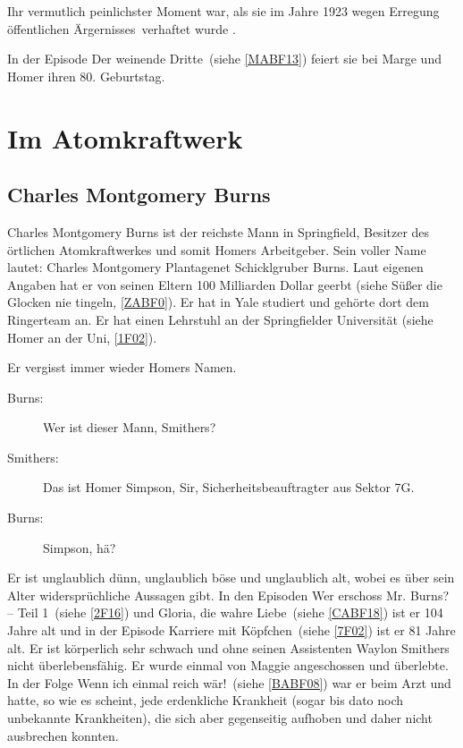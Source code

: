Ihr vermutlich peinlichster Moment war, als sie im Jahre 1923 wegen \glqq Erregung öffentlichen Ärgernisses\grqq\ verhaftet wurde \cite{SpringfieldAt}.

In der Episode \glqq Der weinende Dritte\grqq\ (siehe \ref{MABF13}) feiert sie bei Marge und Homer ihren 80. Geburtstag.

\section{Im Atomkraftwerk}

\subsection{Charles Montgomery Burns}\label{CMBurns}
Charles Montgomery Burns ist der reichste Mann in Springfield, Besitzer des örtlichen Atomkraftwerkes und somit Homers Arbeitgeber. Sein voller Name lautet: Charles Montgomery Plantagenet Schicklgruber Burns. Laut eigenen Angaben hat er von seinen Eltern 100 Milliarden Dollar geerbt (siehe \glqq Süßer die Glocken nie tingeln\grqq, \ref{ZABF0}). Er hat in Yale studiert und gehörte dort dem Ringerteam an. Er hat einen Lehrstuhl an der Springfielder Universität (siehe \glqq Homer an der Uni\grqq, \ref{1F02}). 

Er vergisst immer wieder Homers Namen.
\begin{description}
	\item[Burns:] \glqq Wer ist dieser Mann, Smithers?\grqq
	\item[Smithers:] \glqq Das ist Homer Simpson, Sir, Sicherheitsbeauftragter aus Sektor 7G.\grqq
	\item[Burns:] \glqq Simpson, hä?\grqq
\end{description}
Er ist unglaublich dünn, unglaublich böse und unglaublich alt, wobei es über sein Alter widersprüchliche Aussagen gibt. In den Episoden \glqq Wer erschoss Mr. Burns? -- Teil 1\grqq\ (siehe \ref{2F16}) und \glqq Gloria, die wahre Liebe\grqq\ (siehe \ref{CABF18}) ist er 104 Jahre alt und in der Episode \glqq Karriere mit Köpfchen\grqq\ (siehe \ref{7F02}) ist er 81 Jahre alt. Er ist körperlich sehr schwach und ohne seinen Assistenten Waylon Smithers nicht überlebensfähig. Er wurde einmal von Maggie angeschossen und überlebte. In der Folge \glqq Wenn ich einmal reich wär!\grqq\ (siehe \ref{BABF08}) war er beim Arzt und hatte, so wie es scheint, jede erdenkliche Krankheit (sogar bis dato noch unbekannte Krankheiten), die sich aber gegenseitig aufhoben und daher nicht ausbrechen konnten.

